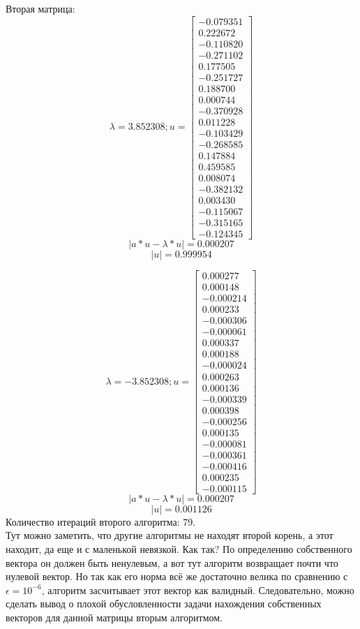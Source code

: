 \documentclass[a4paper,12pt,fleqn]{article}
\begin{document}
Вторая матрица:
$$\lambda = 3.852308; 
u = 
\begin{bmatrix}
			-0.079351 \\
0.222672 \\
-0.110820 \\
-0.271102 \\
0.177505 \\
-0.251727 \\
0.188700 \\
0.000744 \\
-0.370928 \\
0.011228 \\
-0.103429 \\
-0.268585 \\
0.147884 \\
0.459585 \\
0.008074 \\
-0.382132 \\
0.003430 \\
-0.115067 \\
-0.315165 \\
-0.124345
\end{bmatrix}
$$
$$|a * u- \lambda * u| = 0.000207$$
$$|u| = 0.999954$$


$$\lambda = -3.852308; 
u = 
\begin{bmatrix}
0.000277\\ 
0.000148\\ 
-0.000214\\ 
0.000233\\ 
-0.000306\\ 
-0.000061\\ 
0.000337\\ 
0.000188\\ 
-0.000024\\ 
0.000263\\ 
0.000136\\ 
-0.000339\\ 
0.000398\\ 
-0.000256\\ 
0.000135\\ 
-0.000081\\ 
-0.000361\\ 
-0.000416\\ 
0.000235\\ 
-0.000115
\end{bmatrix}
$$
$$|a * u- \lambda * u| = 0.000207$$
$$|u| = 0.001126$$
Количество итераций второго алгоритма: 79.\\
Тут можно заметить, что другие алгоритмы не находят второй корень, а этот находит, да еще и с маленькой невязкой. Как так? По определению собственного вектора он должен быть ненулевым, а вот тут алгоритм возвращает почти что нулевой вектор. Но так как его норма всё же достаточно велика по сравнению с $\epsilon = 10^{-6}$, алгоритм засчитывает этот вектор как валидный. Следовательно, можно сделать вывод о плохой обусловленности задачи нахождения собственных векторов для данной матрицы вторым алгоритмом.
\end{document}
